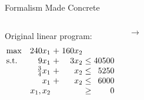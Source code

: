 \documentclass{beamer}
\begin{document}
\begin{frame}{Formalism Made Concrete}
    \begin{columns}
        Original linear program:
        \begin{equation*}
        \setlength\arraycolsep{1.5pt}
          \begin{array}{l@{\quad} r c r c r}
            \max          & 240x_1 & + &         160x_2 &      &    \\
            \mathrm{s.t.} &   9x_1 & + &           3x_2 & \leq & 40500 \\
                          &    \frac{3}{4}x_1 & + &           x_2 & \leq &  5250 \\
                          & x_1 & + & x_2 & \leq & 6000 \\
                          &    x_1, x_2 &  & & \geq &  0 \\
          \end{array}
        \end{equation*}
        
        \pause
        $\rightarrow$
        

\end{columns}
\end{frame}
\end{document}
